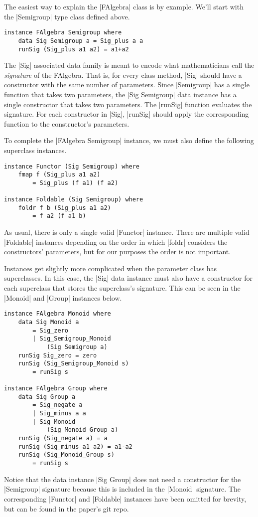 \documentclass[preprint]{sigplanconf}
\theoremstyle{definition}
\begin{document}
The easiest way to explain the |FAlgebra| class is by example.
We'll start with the |Semigroup| type class defined above.
\begin{lstlisting}
instance FAlgebra Semigroup where
    data Sig Semigroup a = Sig_plus a a
    runSig (Sig_plus a1 a2) = a1+a2
\end{lstlisting}
The |Sig| associated data family is meant to encode what mathematicians call the \emph{signature} of the FAlgebra.
That is, for every class method, |Sig| should have a constructor with the same number of parameters.
Since |Semigroup| has a single function that takes two parameters,
the |Sig Semigroup| data instance has a single constructor that takes two parameters.
The |runSig| function evaluates the signature.
For each constructor in |Sig|, |runSig| should apply the corresponding function to the constructor's parameters.

To complete the |FAlgebra Semigroup| instance, we must also define the following superclass instances.
\begin{lstlisting}
instance Functor (Sig Semigroup) where
    fmap f (Sig_plus a1 a2)
        = Sig_plus (f a1) (f a2)

instance Foldable (Sig Semigroup) where
    foldr f b (Sig_plus a1 a2)
        = f a2 (f a1 b)
\end{lstlisting}
As usual, there is only a single valid |Functor| instance.
There are multiple valid |Foldable| instances depending on the order in which |foldr| considers the constructors' parameters,
but for our purposes the order is not important.

Instances get slightly more complicated when the parameter class has superclasses.
In this case, the |Sig| data instance must also have a constructor for each superclass that stores the superclass's signature.
This can be seen in the |Monoid| and |Group| instances below.
\begin{lstlisting}
instance FAlgebra Monoid where
    data Sig Monoid a
        = Sig_zero
        | Sig_Semigroup_Monoid
            (Sig Semigroup a)
    runSig Sig_zero = zero
    runSig (Sig_Semigroup_Monoid s)
        = runSig s

instance FAlgebra Group where
    data Sig Group a
        = Sig_negate a
        | Sig_minus a a
        | Sig_Monoid
            (Sig_Monoid_Group a)
    runSig (Sig_negate a) = a
    runSig (Sig_minus a1 a2) = a1-a2
    runSig (Sig_Monoid_Group s)
        = runSig s
\end{lstlisting}
Notice that the data instance |Sig Group| does not need a constructor for the |Semigroup| signature because this is included in the |Monoid| signature.
The corresponding |Functor| and |Foldable| instances have been omitted for brevity,
but can be found in the paper's git repo.
\end{document}
